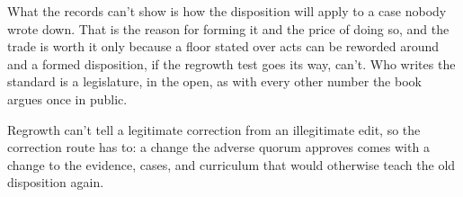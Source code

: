 {What the records can't show is how the disposition will apply to a case nobody wrote down. That is the reason for forming it and the price of doing so, and the trade is worth it only because a floor stated over acts can be reworded around and a formed disposition, if the regrowth test goes its way, can't.
}
Who writes the standard is a legislature, in the open, as with every other number the book argues once in public.

Regrowth can't tell a legitimate correction from an illegitimate edit, so the correction route has to: a change the adverse quorum approves comes with a change to the evidence, cases, and curriculum that would otherwise teach the old disposition again.
